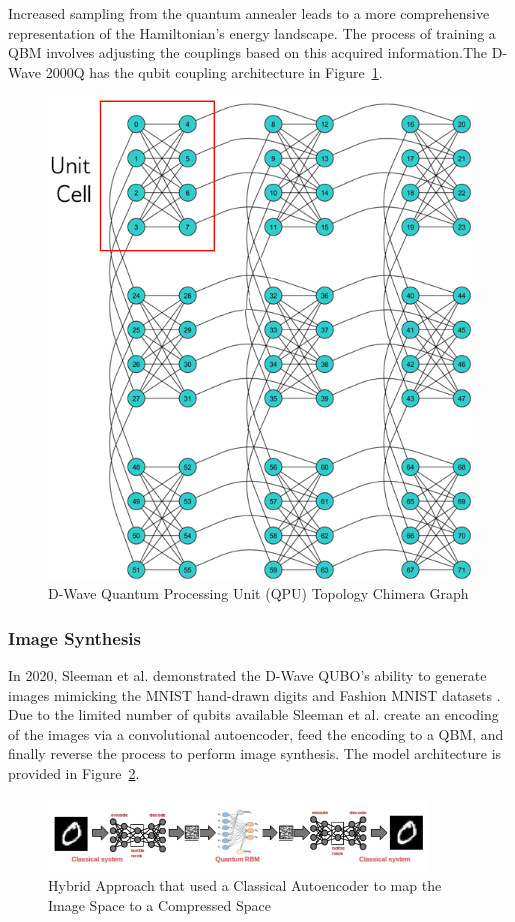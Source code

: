 \documentclass[%
 reprint,
 amsmath,amssymb,
 aps,
]{revtex4-2}
\begin{document}
Increased sampling from the quantum annealer leads to a more comprehensive representation of the Hamiltonian's energy landscape. The process of training a QBM involves adjusting the couplings based on this acquired information.The D-Wave 2000Q has the qubit coupling architecture in Figure~\ref{fig:chimera}.

\begin{figure}[h]
    \includegraphics[width=0.7\columnwidth]{chimera.png}
    \caption{\label{fig:chimera} D-Wave Quantum Processing Unit (QPU) Topology Chimera Graph \cite{dwavedocs}}
\end{figure}

\subsubsection{Image Synthesis}
In 2020, Sleeman et al. demonstrated the D-Wave QUBO's ability to generate images mimicking the MNIST hand-drawn digits and Fashion MNIST datasets \cite{qmlimggen}. Due to the limited number of qubits available Sleeman et al. create an encoding of the images via a convolutional autoencoder, feed the encoding to a QBM, and finally reverse the process to perform image synthesis. The model architecture is provided in Figure~\ref{fig:hybridML}.

\begin{figure}
    \includegraphics[width=0.9\textwidth]{qmlimgimg.png}
    \caption{\label{fig:hybridML} Hybrid Approach that used a Classical Autoencoder to map the Image Space to a Compressed Space \cite{qmlimggen}}
\end{figure}
\end{document}
